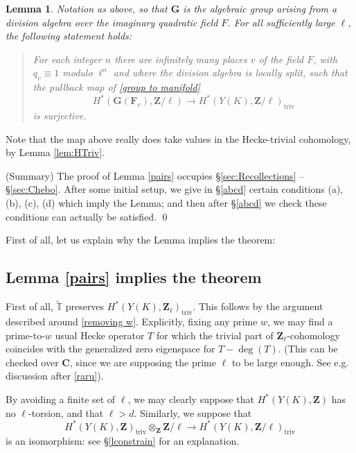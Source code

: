 \documentclass[10pt]{amsart}
\newcommand{\changecolor}{black}
\newcommand{\Z}{\mathbf{Z}}
\newcommand{\triv}{\mathrm{triv}}
\newcommand{\gHecke}{\tilde{\mathbb{T}}}
\newcommand{\C}{\mathbf{C}}
\newtheorem{lemma}[subsection]{Lemma}
\theoremstyle{remark}
\begin{document}
\begin{lemma}  \label{pairs}
Notation as above, so that $\mathbf{G}$ is the algebraic group arising from a division algebra over  the imaginary quadratic field $F$.     
For all sufficiently large $\ell$, the following statement holds: 
\begin{quote} 
 For each integer $n$ there are infinitely many places $v$ of the field $F$, with $q_v \equiv 1 $ modulo $\ell^n$ and where the division algebra is locally split, 
such that the pullback map   of \eqref{group to manifold}
$$H^*(\mathbf{G}(\mathbf{F}_v), \Z/\ell) \rightarrow H^*(Y(K), \Z/\ell)_{\triv} $$
 is surjective.  
\end{quote}
 \end{lemma}
 Note that the map above really does take values in the Hecke-trivial cohomology, by Lemma \ref{lem:HTriv}.
 
 

\proof (Summary)
The proof of Lemma \eqref{pairs} occupies  \S \ref{sec:Recollections} 
-- 
\S \ref{sec:Chebo}.  After some initial setup, 
we give in \S \ref{abcd} certain conditions (a), (b), (c), (d) which imply the Lemma;
and then after \S \ref{abcd} we check these conditions can actually be satisfied. 
\qed

First of all, let us explain   why the Lemma implies the theorem:

 \subsection{Lemma \eqref{pairs} implies the theorem}  \label{lemmaimpliestheorem}
 
  
 \proof  
 {\color{\changecolor} First of all, $\gHecke$ preserves $H^*(Y(K), \Z_{\ell})_{\triv}$. 
 This follows by the argument described around \eqref{removing w}. Explicitly,
 fixing any prime $w$, we may find  a prime-to-$w$ usual Hecke operator $T$
for which the trivial part of $\Z_{\ell}$-cohomology coincides with the generalized zero eigenspace for $T-\deg(T)$. 
(This can be checked over $\C$, since we are supposing the prime $\ell$ to be large enough. See e.g. discussion after \eqref{raru}).}

 
By avoiding a finite set of $\ell$, we may clearly suppose    that $H^*(Y(K), \Z)$ has no $\ell$-torsion,
and that $\ell > d$. 
Similarly, we suppose that  
 $$H^*(Y(K), \Z)_{\triv} \otimes_{\Z} \Z/\ell \rightarrow H^*(Y(K), \Z/\ell)_{\triv}$$
 is an isomorphism: see \S \ref{lconstrain} for an explanation.  
 
\end{document}
